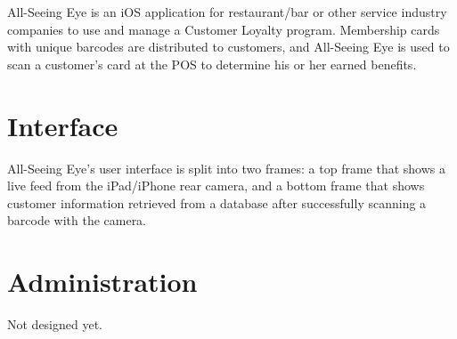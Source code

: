 All-\/Seeing Eye is an iOS application for restaurant/bar or other service industry companies to use and manage a Customer Loyalty program. Membership cards with unique barcodes are distributed to customers, and All-\/Seeing Eye is used to scan a customer's card at the POS to determine his or her earned benefits.\hypertarget{main_User}{}\section{Interface}\label{main_User}
All-\/Seeing Eye's user interface is split into two frames: a top frame that shows a live feed from the iPad/iPhone rear camera, and a bottom frame that shows customer information retrieved from a database after successfully scanning a barcode with the camera.\hypertarget{main_Customer}{}\section{Administration}\label{main_Customer}
Not designed yet. 